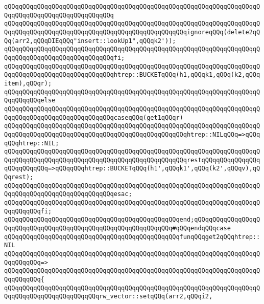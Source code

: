\verb|qQQqqQQqqQQqqQQqqQQqqQQqqQQqqQQqqQQqqQQqqQQqqQQqqQQqqQQqqQQqqQQqqQQqqQQqqQQqqQQqqQQqqQQqqQQqqQQqqQQq|\newline
\verb|qQQqqQQqqQQqqQQqqQQqqQQqqQQqqQQqqQQqqQQqqQQqqQQqqQQqqQQqqQQqqQQqqQQqqQQqqQQqqQQqqQQqqQQqqQQqqQQqqQQqqQQqqQQqqQQqqQQqqQQqignoreqQQq(delete2qQQq(arr2,qQQqDIEqQQq"insert::lookUp1",qQQqk2'));|\newline
\verb|qQQqqQQqqQQqqQQqqQQqqQQqqQQqqQQqqQQqqQQqqQQqqQQqqQQqqQQqqQQqqQQqqQQqqQQqqQQqqQQqqQQqqQQqqQQqqQQqqQQqfi;|\newline
\newline
\verb|qQQqqQQqqQQqqQQqqQQqqQQqqQQqqQQqqQQqqQQqqQQqqQQqqQQqqQQqqQQqqQQqqQQqqQQqqQQqqQQqqQQqqQQqqQQqqQQqqQQqhtrep::BUCKETqQQq(h1,qQQqk1,qQQq(k2,qQQqitem),qQQqr);|\newline
\verb|qQQqqQQqqQQqqQQqqQQqqQQqqQQqqQQqqQQqqQQqqQQqqQQqqQQqqQQqqQQqqQQqqQQqqQQqqQQqqQQqelse|\newline
\verb|qQQqqQQqqQQqqQQqqQQqqQQqqQQqqQQqqQQqqQQqqQQqqQQqqQQqqQQqqQQqqQQqqQQqqQQqqQQqqQQqqQQqqQQqqQQqqQQqqQQqcaseqQQq(get1qQQqr)|\newline
\verb|qQQqqQQqqQQqqQQqqQQqqQQqqQQqqQQqqQQqqQQqqQQqqQQqqQQqqQQqqQQqqQQqqQQqqQQqqQQqqQQqqQQqqQQqqQQqqQQqqQQqqQQqqQQqqQQqqQQqqQQqhtrep::NILqQQq=>qQQqqQQqhtrep::NIL;|\newline
\verb|qQQqqQQqqQQqqQQqqQQqqQQqqQQqqQQqqQQqqQQqqQQqqQQqqQQqqQQqqQQqqQQqqQQqqQQqqQQqqQQqqQQqqQQqqQQqqQQqqQQqqQQqqQQqqQQqqQQqqQQqrestqQQqqQQqqQQqqQQqqQQqqQQqqQQq=>qQQqqQQqhtrep::BUCKETqQQq(h1',qQQqk1',qQQq(k2',qQQqv),qQQqrest);|\newline
\verb|qQQqqQQqqQQqqQQqqQQqqQQqqQQqqQQqqQQqqQQqqQQqqQQqqQQqqQQqqQQqqQQqqQQqqQQqqQQqqQQqqQQqqQQqqQQqqQQqqQQqesac;|\newline
\verb|qQQqqQQqqQQqqQQqqQQqqQQqqQQqqQQqqQQqqQQqqQQqqQQqqQQqqQQqqQQqqQQqqQQqqQQqqQQqqQQqfi;|\newline
\verb|qQQqqQQqqQQqqQQqqQQqqQQqqQQqqQQqqQQqqQQqqQQqqQQqend;qQQqqQQqqQQqqQQqqQQqqQQqqQQqqQQqqQQqqQQqqQQqqQQqqQQqqQQqqQQqqQQq#qQQqendqQQqcase|\newline
\newline
\verb|qQQqqQQqqQQqqQQqqQQqqQQqqQQqqQQqqQQqqQQqqQQqqQQqfunqQQqget2qQQqhtrep::NIL|\newline
\verb|qQQqqQQqqQQqqQQqqQQqqQQqqQQqqQQqqQQqqQQqqQQqqQQqqQQqqQQqqQQqqQQqqQQqqQQqqQQqqQQq=>|\newline
\verb|qQQqqQQqqQQqqQQqqQQqqQQqqQQqqQQqqQQqqQQqqQQqqQQqqQQqqQQqqQQqqQQqqQQqqQQqqQQqqQQq{|\newline
\verb|qQQqqQQqqQQqqQQqqQQqqQQqqQQqqQQqqQQqqQQqqQQqqQQqqQQqqQQqqQQqqQQqqQQqqQQqqQQqqQQqqQQqqQQqqQQqqQQqrw_vector::setqQQq(arr2,qQQqi2,|\newline
